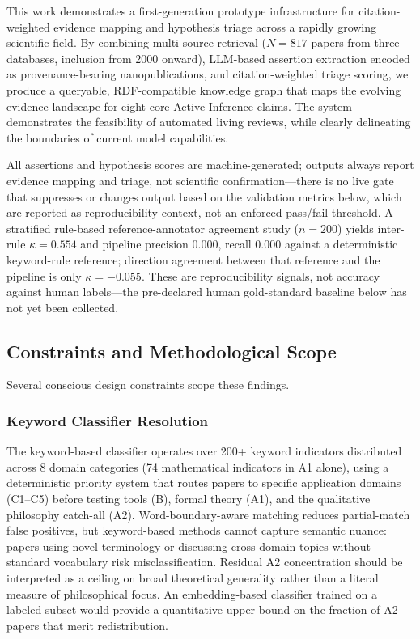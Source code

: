 \documentclass[
  english,
]{article}
\begin{document}
{{{{{{{{{{{{{{{{This work demonstrates a first-generation prototype infrastructure for
citation-weighted evidence mapping and hypothesis triage across a
rapidly growing scientific field. By combining multi-source retrieval
(\(N = 817\) papers from three databases, inclusion from 2000 onward),
LLM-based assertion extraction encoded as provenance-bearing
nanopublications, and citation-weighted triage scoring, we produce a
queryable, RDF-compatible knowledge graph that maps the evolving
evidence landscape for eight core Active Inference claims. The system
demonstrates the feasibility of automated living reviews, while clearly
delineating the boundaries of current model capabilities.

All assertions and hypothesis scores are machine-generated; outputs
always report evidence mapping and triage, not scientific
confirmation---there is no live gate that suppresses or changes output
based on the validation metrics below, which are reported as
reproducibility context, not an enforced pass/fail threshold. A
stratified rule-based reference-annotator agreement study (\(n = 200\))
yields inter-rule \(\kappa = 0.554\) and pipeline precision 0.000,
recall 0.000 against a deterministic keyword-rule reference; direction
agreement between that reference and the pipeline is only
\(\kappa = -0.055\). These are reproducibility signals, not accuracy
against human labels---the pre-declared human gold-standard baseline
below has not yet been collected.

\subsection{Constraints and Methodological
Scope}\label{constraints-and-methodological-scope}

Several conscious design constraints scope these findings.

\subsubsection{Keyword Classifier
Resolution}\label{keyword-classifier-resolution}

The keyword-based classifier operates over 200+ keyword indicators
distributed across 8 domain categories (74 mathematical indicators in A1
alone), using a deterministic priority system that routes papers to
specific application domains (C1--C5) before testing tools (B), formal
theory (A1), and the qualitative philosophy catch-all (A2).
Word-boundary-aware matching reduces partial-match false positives, but
keyword-based methods cannot capture semantic nuance: papers using novel
terminology or discussing cross-domain topics without standard
vocabulary risk misclassification. Residual A2 concentration should be
interpreted as a ceiling on broad theoretical generality rather than a
literal measure of philosophical focus. An embedding-based classifier
trained on a labeled subset would provide a quantitative upper bound on
the fraction of A2 papers that merit redistribution.

}}}}}}}}}}}}}}}}
\end{document}
